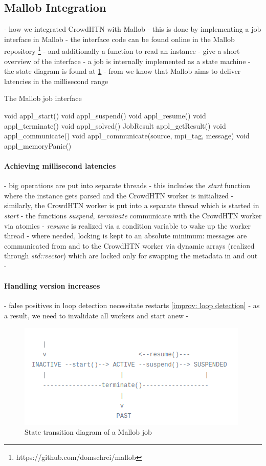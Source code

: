 \subsection{Mallob Integration}
- how we integrated CrowdHTN with Mallob
- this is done by implementing a job interface in Mallob
- the interface code can be found online in the Mallob repository \footnote{https://github.com/domschrei/mallob}
- and additionally a function to read an instance
- give a short overview of the interface
- a job is internally implemented as a state machine
- the state diagram is found at \ref{figure: mallob state diagram}
- from \cite{schreiber2021scalable} we know that Mallob aims to deliver latencies in the millisecond range

\begin{algorithm}
	\caption{The Mallob job interface}
	void appl\_start()\;
	void appl\_suspend()\;
	void appl\_resume()\;
	void appl\_terminate()\;
	void appl\_solved()\;
	JobResult appl\_getResult()\;
	void appl\_communicate()\;
	void appl\_communicate(source, mpi\_tag, message)\;
	void appl\_memoryPanic()\;
\end{algorithm}

\paragraph{Achieving millisecond latencies}
- big operations are put into separate threads
- this includes the \textit{start} function where the instance gets parsed and the CrowdHTN worker is initialized
- similarly, the CrowdHTN worker is put into a separate thread which is started in \textit{start}
- the functions \textit{suspend}, \textit{terminate} communicate with the CrowdHTN worker via atomics
- \textit{resume} is realized via a condition variable to wake up the worker thread
- where needed, locking is kept to an absolute minimum: messages are communicated from and to the CrowdHTN worker via dynamic arrays (realized through \textit{std::vector}) which are locked only for swapping the metadata in and out
- 

\paragraph{Handling version increases}
- false positives in loop detection necessitate restarts \ref{improv: loop detection}
- as a result, we need to invalidate all workers and start anew
-

\begin{figure}
	\caption{State transition diagram of a Mallob job}
	\label{figure: mallob state diagram}
	\centering
	\includegraphics{images/prelim/mallob_state_diagram}
\end{figure}